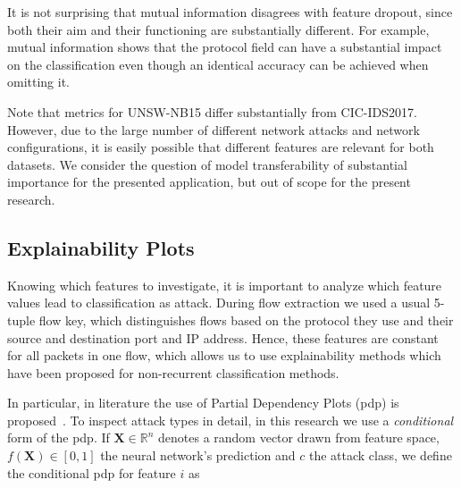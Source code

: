 \documentclass[conference]{IEEEtran}
\begin{document}
It is not surprising that mutual information disagrees with feature dropout, since both their aim and their functioning are substantially different. For example, mutual information shows that the protocol field can have a substantial impact on the classification even though an identical accuracy can be achieved when omitting it.


Note that metrics for UNSW-NB15 differ substantially from CIC-IDS2017. However, due to the large number of different network attacks and network configurations, it is easily possible that different features are relevant for both datasets. We consider the question of model transferability of substantial importance for the presented application, but out of scope for the present research.

\subsection{Explainability Plots}
Knowing which features to investigate, it is important to analyze which feature values lead to classification as attack.
During flow extraction we used a usual 5-tuple flow key, which distinguishes flows based on the protocol they use and their source and destination port and IP address. Hence, these features are constant for all packets in one flow, which allows us to use explainability methods which have been proposed for non-recurrent classification methods.

In particular,  in literature the use of Partial Dependency Plots (\gls{pdp}) is proposed~\cite{friedman_greedy_2001}. To inspect attack types in detail, in this research we use a \textit{conditional} form of the \gls{pdp}. If $\boldsymbol X \in \mathbb R ^n$ denotes a random vector drawn from feature space, $f(\boldsymbol X) \in [0,1]$ the neural network's prediction and $c$ the attack class, we define the conditional \gls{pdp} for feature $i$  as
\end{document}
